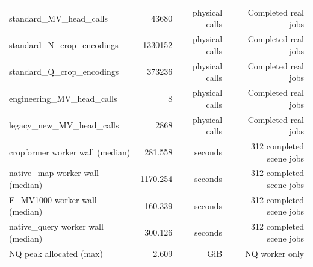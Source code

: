 \begin{table}[t]
\begin{tabular}{lrrr}
standard\_MV\_head\_calls & 43680 & physical calls & Completed real jobs \\
standard\_N\_crop\_encodings & 1330152 & physical calls & Completed real jobs \\
standard\_Q\_crop\_encodings & 373236 & physical calls & Completed real jobs \\
engineering\_MV\_head\_calls & 8 & physical calls & Completed real jobs \\
legacy\_new\_MV\_head\_calls & 2868 & physical calls & Completed real jobs \\
cropformer worker wall (median) & 281.558 & seconds & 312 completed scene jobs \\
native\_map worker wall (median) & 1170.254 & seconds & 312 completed scene jobs \\
F\_MV1000 worker wall (median) & 160.339 & seconds & 312 completed scene jobs \\
native\_query worker wall (median) & 300.126 & seconds & 312 completed scene jobs \\
NQ peak allocated (max) & 2.609 & GiB & NQ worker only \\
\bottomrule
\end{tabular}
\end{table}

